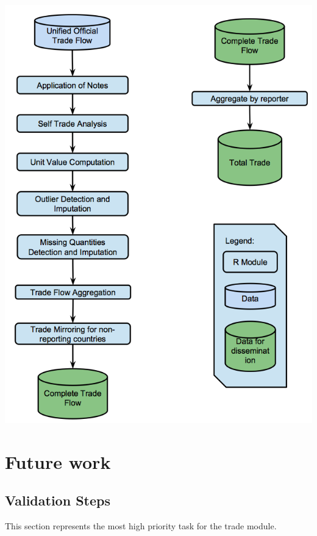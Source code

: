 \documentclass[nojss]{jss}\usepackage[]{graphicx}\usepackage[]{color}
\begin{document}
\begin{center}\includegraphics[scale = 0.01]{"trade_1_bis"}\end{center}


\newpage
\section{Future work}

\subsection{Validation Steps}
This section represents the most high priority task for the trade module.\\
\end{document}
